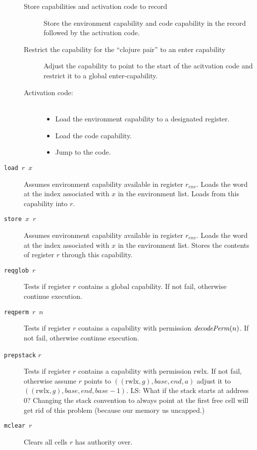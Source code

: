 \documentclass[a4paper]{article}
\newcommand{\forcenewline}{$\phantom{v}$\\}
\newcommand\lau[1]{{\color{purple} \sf \footnotesize {LS: #1}}\\}
\newcommand{\var}[1]{\mathit{#1}}
\newcommand{\gl}{\var{g}}
\newcommand{\addr}{\var{a}}
\newcommand{\start}{\var{base}}
\newcommand{\addrend}{\var{end}}
\newcommand{\plainfun}[2]{
  \ifthenelse{\equal{#2}{}}
  {\mathit{#1}}
  {\mathit{#1}(#2)}
}
\newcommand{\decodePerm}[1]{\plainfun{decodePerm}{#1}}
\newcommand{\plainperm}[1]{\mathrm{#1}}
\newcommand{\rwlx}{\plainperm{rwlx}}
\newcommand{\glob}{\plainperm{global}}
\begin{document}
\begin{description}
\begin{description}
                \item[Store capabilities and activation code to record] Store the environment capability and code capability in the record followed by the activation code. 
                \item[Restrict the capability for the ``clojure pair'' to an enter capability] Adjust the capability to point to the start of the acitvation code and restrict it to a global enter-capability.
                \item[Activation code:] \forcenewline
                  \begin{itemize}
                  \item Load the environment capability to a designated register.
                  \item Load the code capability.
                  \item Jump to the code.
                  \end{itemize}
                \end{description}
              \item[\texttt{load $r$ $x$}] Assumes environment capability available in register $r_{\var{env}}$. Loads the word at the index associated with $x$ in the environment list. Loads from this capability into $r$.
              \item[\texttt{store $x$ $r$}] Assumes environment capability available in register $r_{\var{env}}$. Loads the word at the index associated with $x$ in the environment list. Stores the contents of register $r$ through this capability.
              \item[\texttt{reqglob $r$}] Tests if register $r$ contains a $\glob$ capability. If not fail, otherwise continue execution.
              \item[\texttt{reqperm $r$ $n$}] Tests if register $r$ contains a capability with permission $\decodePerm{n}$. If not fail, otherwise continue execution.
              \item[\texttt{prepstack} $r$] Tests if register $r$ contains a capability with permission $\rwlx$. If not fail, otherwise assume $r$ points to $((\rwlx,\gl),\start,\addrend,\addr)$ adjust it to $((\rwlx,\gl),\start,\addrend,\start - 1)$. 
                \lau{What if the stack starts at address 0? Changing the stack convention to always point at the first free cell will get rid of this problem (because our memory us uncapped.)}
              \item[\texttt{mclear $r$}] Clears all cells $r$ has authority over. 
              \end{description}
\end{document}

